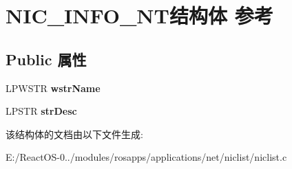 \hypertarget{struct_n_i_c___i_n_f_o___n_t}{}\section{N\+I\+C\+\_\+\+I\+N\+F\+O\+\_\+\+N\+T结构体 参考}
\label{struct_n_i_c___i_n_f_o___n_t}
\subsection*{Public 属性}
\begin{DoxyCompactItemize}
\item 
\mbox{\label{struct_n_i_c___i_n_f_o___n_t_a58a0574b51ba17217e13536ab1fcd09b}} 
L\+P\+W\+S\+TR {\bfseries wstr\+Name}
\item 
\mbox{\label{struct_n_i_c___i_n_f_o___n_t_ac77a23db262c1de1aa143537db4a7f2a}} 
L\+P\+S\+TR {\bfseries str\+Desc}
\end{DoxyCompactItemize}


该结构体的文档由以下文件生成\+:\begin{DoxyCompactItemize}
\item 
E\+:/\+React\+O\+S-\/0../modules/rosapps/applications/net/niclist/niclist.\+c\end{DoxyCompactItemize}
